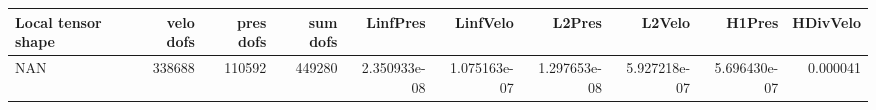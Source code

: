 \begin{tabular}{lrrrrrrrrr}
\toprule
Local tensor shape &  velo dofs &  pres dofs &  sum dofs &     LinfPres &     LinfVelo &       L2Pres &       L2Velo &       H1Pres &  HDivVelo \\
\midrule
               NAN &     338688 &     110592 &    449280 & 2.350933e-08 & 1.075163e-07 & 1.297653e-08 & 5.927218e-07 & 5.696430e-07 &  0.000041 \\
\bottomrule
\end{tabular}
